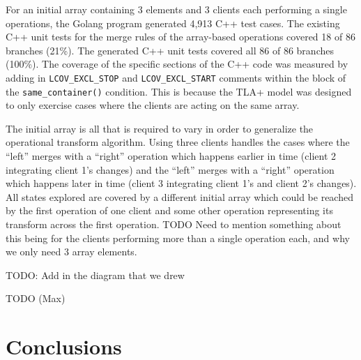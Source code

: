\documentclass{vldb}
\begin{document}
For an initial array containing 3 elements and 3 clients each performing a single operations, the Golang program generated 4,913 C++ test cases. The existing C++ unit tests for the merge rules of the array-based operations covered 18 of 86 branches (21\%). The generated C++ unit tests covered all 86 of 86 branches (100\%). The coverage of the specific sections of the C++ code was measured by adding in \texttt{LCOV\_EXCL\_STOP} and \texttt{LCOV\_EXCL\_START} comments within the block of the \texttt{same\_container()} condition. This is because the TLA+ model was designed to only exercise cases where the clients are acting on the same array.


The initial array is all that is required to vary in order to generalize the operational transform algorithm. Using three clients handles the cases where the ``left'' merges with a ``right'' operation which happens earlier in time (client 2 integrating client 1's changes) and the ``left'' merges with a ``right'' operation which happens later in time (client 3 integrating client 1's and client 2's changes). All states explored are covered by a different initial array which could be reached by the first operation of one client and some other operation representing its transform across the first operation. TODO Need to mention something about this being for the clients performing more than a single operation each, and why we only need 3 array elements.

TODO: Add in the diagram that we drew

TODO (Max)

\section{Conclusions}
\label{sec:conclusions}
\end{document}
